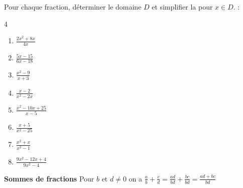\documentclass[main.tex]{subfiles}
\begin{document}
\begin{exercise} \label{chapitre02:fractionalgebriques:simplification} Pour chaque fraction, déterminer le domaine $D$ et simplifier la pour $x\in D$. :\hfill \vspace{-0.5em}
\begin{multicols}{4} 
\begin{enumerate}[label={$\Alph*(x)=$\rule{0pt}{1.8em}}, leftmargin=*] 
\item $\frac{2x^2+8x}{4x}$ 
\item $\frac{5x-15}{6x-18}$
\item $\frac{x^2-9}{x+3}$
\item $\frac{x-2}{x^2-2x}$  
\item $\frac{x^2-10x+25}{x-5}$
\item $\frac{x+5}{x^2-25}$ 
\item $\frac{x^2+x}{x^2-1}$  	
\item $\frac{9x^2-12x+4}{9x^2-4}$  
\end{enumerate}
\end{multicols}
\end{exercise} 
\begin{eBox}
	\textbf{Sommes de fractions}	Pour $b$ et $d\neq 0$ on a  $\frac{a}{b}+\frac{c}{d}=\frac{ad}{bd}+\frac{bc}{bd}=\frac{ad+bc}{bd}$
\end{eBox}
\end{document}
